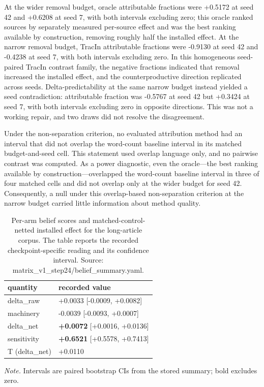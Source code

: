 \documentclass[10pt]{article}
\begin{document}
At the wider removal budget, oracle attributable fractions were +0.5172 at seed 42 and +0.6208 at seed 7, with both intervals excluding zero; this oracle ranked sources by separately measured per-source effect and was the best ranking available by construction, removing roughly half the installed effect. At the narrow removal budget, TracIn attributable fractions were -0.9130 at seed 42 and -0.4238 at seed 7, with both intervals excluding zero. In this homogeneous seed-paired TracIn contrast family, the negative fractions indicated that removal increased the installed effect, and the counterproductive direction replicated across seeds. Delta-predictability at the same narrow budget instead yielded a seed contradiction: attributable fraction was -0.5767 at seed 42 but +0.3424 at seed 7, with both intervals excluding zero in opposite directions. This was not a working repair, and two draws did not resolve the disagreement.



Under the non-separation criterion, no evaluated attribution method had an interval that did not overlap the word-count baseline interval in its matched budget-and-seed cell. This statement used overlap language only, and no pairwise contrast was computed. As a power diagnostic, even the oracle—the best ranking available by construction—overlapped the word-count baseline interval in three of four matched cells and did not overlap only at the wider budget for seed 42. Consequently, a null under this overlap-based non-separation criterion at the narrow budget carried little information about method quality.





\begin{table}[H]
\centering
\footnotesize
\caption{ Per-arm belief scores and matched-control-netted installed effect for the long-article corpus. The table reports the recorded checkpoint-specific reading and its confidence interval. Source: matrix\_v1\_step24/belief\_summary.yaml. }
\label{tab:belief_transfer}



\begin{tabular}{ ll }
\toprule
quantity & recorded value \\
\midrule

delta\_raw & +0.0033 [-0.0009, +0.0082] \\

machinery & -0.0039 [-0.0093, +0.0007] \\

delta\_net & \textbf{+0.0072} [+0.0016, +0.0136] \\

sensitivity & \textbf{+0.6521} [+0.5578, +0.7413] \\

T (delta\_net) & +0.0110 \\

\bottomrule
\end{tabular}

\par\footnotesize\emph{Note.} Intervals are paired bootstrap CIs from the stored summary; bold excludes zero.
\end{table}
\end{document}
